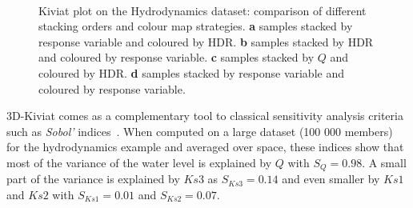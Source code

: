 \begin{figure}[!h]
~
\caption{Kiviat plot on the Hydrodynamics dataset: comparison of different stacking orders and colour map strategies. \textbf{a} samples stacked by response variable and coloured by HDR. \textbf{b} samples stacked by HDR and coloured by response variable. \textbf{c} samples stacked by $Q$ and coloured by HDR. \textbf{d} samples stacked by response variable and coloured by response variable.}
\label{fig:Kiviat_order}
\end{figure}

3D-Kiviat comes as a complementary tool to classical sensitivity analysis criteria such as \emph{Sobol'} indices~\citep{Saltelli2007}. When computed on a large dataset (100 000 members) for the hydrodynamics example and averaged over space, these indices show that most of the variance of the water level is explained by $Q$ with $S_Q=0.98$. A small part of the variance is explained by $Ks3$ as $S_{Ks3} = 0.14$ and even smaller by $Ks1$ and $Ks2$ with $S_{Ks1}=0.01$ and $S_{Ks2} = 0.07$.


